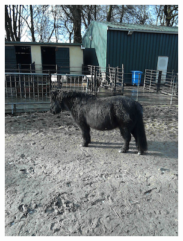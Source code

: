 \documentclass{l4proj}
\begin{document}
\begin{figure}[ht]
\begin{subfigure}[h!]{0.18\textwidth}
    \includegraphics[width=\textwidth, trim={0cm 1.6cm 0cm 1.6cm}, clip]{images/dataset/pony/rgb.png}

\end{subfigure}
\end{figure}
\end{document}
